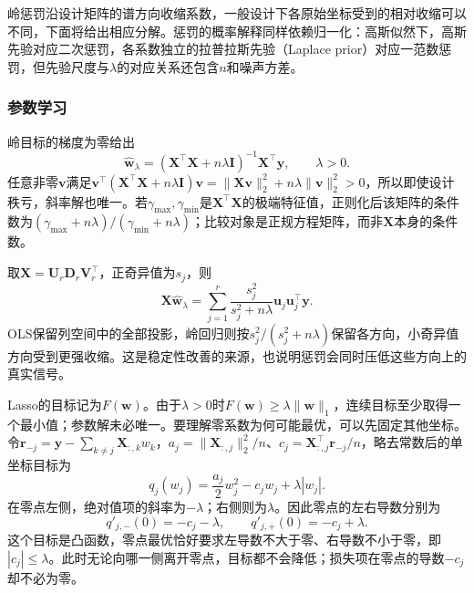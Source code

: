 岭惩罚沿设计矩阵的谱方向收缩系数，一般设计下各原始坐标受到的相对收缩可以不同，下面将给出相应分解。惩罚的概率解释同样依赖归一化：高斯似然下，高斯先验对应二次惩罚，各系数独立的拉普拉斯先验（Laplace prior）对应一范数惩罚，但先验尺度与$\lambda$的对应关系还包含$n$和噪声方差。

\subsubsection{参数学习}
\label{sec:regression-regularization-learning}

岭目标的梯度为零给出
\begin{equation}
  \widehat{\bm{w}}_{\lambda}
  =(\bm{X}^{\top}\bm{X}+n\lambda\bm{I})^{-1}\bm{X}^{\top}\bm{y},
  \qquad\lambda>0.
  \label{eq:regression-ridge-solution}
\end{equation}
任意非零$\bm{v}$满足$\bm{v}^{\top}(\bm{X}^{\top}\bm{X}+n\lambda\bm{I})\bm{v}=\lVert\bm{X}\bm{v}\rVert_2^2+n\lambda\lVert\bm{v}\rVert_2^2>0$，所以即使设计秩亏，斜率解也唯一。若$\gamma_{\max},\gamma_{\min}$是$\bm{X}^{\top}\bm{X}$的极端特征值，正则化后该矩阵的条件数为$(\gamma_{\max}+n\lambda)/(\gamma_{\min}+n\lambda)$；比较对象是正规方程矩阵，而非$\bm{X}$本身的条件数。

取$\bm{X}=\bm{U}_r\bm{D}_r\bm{V}_r^{\top}$，正奇异值为$s_j$，则
\begin{equation}
  \bm{X}\widehat{\bm{w}}_{\lambda}
  =\sum_{j=1}^{r}\frac{s_j^2}{s_j^2+n\lambda}
       \bm{u}_j\bm{u}_j^{\top}\bm{y}.
  \label{eq:regression-ridge-spectral}
\end{equation}
OLS保留列空间中的全部投影，岭回归则按$s_j^2/(s_j^2+n\lambda)$保留各方向，小奇异值方向受到更强收缩。这是稳定性改善的来源，也说明惩罚会同时压低这些方向上的真实信号。

Lasso的目标记为$F(\bm{w})$。由于$\lambda>0$时$F(\bm{w})\geq\lambda\lVert\bm{w}\rVert_1$，连续目标至少取得一个最小值；参数解未必唯一。要理解零系数为何可能最优，可以先固定其他坐标。令$\bm{r}_{-j}=\bm{y}-\sum_{k\ne j}\bm{X}_{:,k}w_k$，$a_j=\lVert\bm{X}_{:,j}\rVert_2^2/n$、$c_j=\bm{X}_{:,j}^{\top}\bm{r}_{-j}/n$，略去常数后的单坐标目标为
\[
  q_j(w_j)=\frac{a_j}{2}w_j^2-c_jw_j+\lambda|w_j|.
\]
在零点左侧，绝对值项的斜率为$-\lambda$；右侧则为$\lambda$。因此零点的左右导数分别为
\[
  q'_{j,-}(0)=-c_j-\lambda,\qquad
  q'_{j,+}(0)=-c_j+\lambda.
\]
这个目标是凸函数，零点最优恰好要求左导数不大于零、右导数不小于零，即$|c_j|\leq\lambda$。此时无论向哪一侧离开零点，目标都不会降低；损失项在零点的导数$-c_j$却不必为零。

